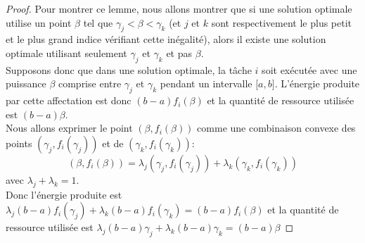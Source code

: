 \documentclass{report}
\begin{document}
\begin{proof}
  Pour montrer ce lemme, nous allons montrer que si une solution optimale utilise un point $\beta$ tel que $ \gamma_j < \beta < \gamma_k$ (et $j$ et $k$ sont respectivement le plus petit et le plus grand indice vérifiant cette inégalité), alors il existe une solution optimale utilisant seulement $\gamma_j$ et $\gamma_k$ et pas $\beta$.\\
Supposons donc que dans une solution optimale, la tâche $i$ soit exécutée avec une puissance $\beta$ comprise entre $\gamma_j$ et $\gamma_k$ pendant un intervalle ${[}a,b{]}$. L'énergie produite par cette affectation est donc $(b-a)f_i(\beta)$ et la quantité de ressource utilisée est $(b-a)\beta$.\\
Nous allons exprimer le point $(\beta,f_i(\beta))$ comme une combinaison convexe des points $(\gamma_j,f_i(\gamma_j))$ et de $(\gamma_k,f_i(\gamma_k))$:
\[ (\beta,f_i(\beta))= \lambda_j (\gamma_j,f_i(\gamma_j)) + \lambda_k (\gamma_k,f_i(\gamma_k))
\]
avec $\lambda_j + \lambda_k=1$.\\
Donc l'énergie produite est $\lambda_j(b-a)f_i(\gamma_j)+\lambda_k(b-a)f_i(\gamma_k)=(b-a)f_i(\beta)$ et la quantité de ressource utilisée est $\lambda_j(b-a)\gamma_j+\lambda_k(b-a)\gamma_k=(b-a)\beta$

\end{proof}
	
\end{document}
